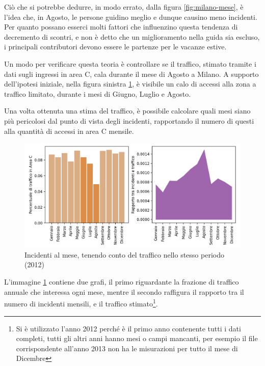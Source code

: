 \documentclass[a4paper,12pt]{report}
\begin{document}
Ciò che si potrebbe dedurre, in modo errato, dalla figura \ref{fig:milano-mese}, 
è l'idea che, in Agosto, le persone guidino meglio e dunque causino meno incidenti. 
Per quanto possano esserci molti fattori che influenzino questa tendenza di 
decremento di scontri, e non è detto che un miglioramento nella guida sia escluso, 
i principali contributori devono essere le partenze 
per le vacanze estive.

Un modo per verificare questa teoria è controllare se il traffico, 
stimato tramite i dati sugli ingressi in area C, cala durante il mese di 
Agosto a Milano. 
A supporto dell'ipotesi iniziale, nella figura sinistra \ref{fig:incidenti-traffico-mese}, 
è visibile un calo di accessi alla zona a traffico limitato, 
durante i mesi di Giugno, Luglio e Agosto.

Una volta ottenuta una stima del traffico, è possibile calcolare quali mesi 
siano più pericolosi dal punto di vista degli incidenti, 
rapportando il numero di questi alla quantità di accessi in area C mensile.

\begin{figure}
    \includegraphics[width=\linewidth]{../src/area_c/rapporto_mese.png}
    \caption{Incidenti al mese, tenendo conto del traffico nello stesso periodo (2012)}
    \label{fig:incidenti-traffico-mese}
\end{figure}

L'immagine \ref{fig:incidenti-traffico-mese} contiene due grafi, 
il primo riguardante la frazione di traffico annuale che interessa ogni mese, 
mentre il secondo raffigura il rapporto tra il numero di incidenti mensili, e il traffico 
stimato\footnote{Si è utilizzato l'anno 2012 perché è il primo anno contenente 
tutti i dati completi, tutti gli altri anni hanno mesi o campi mancanti, 
per esempio il file corrispondente all'anno 
2013 non ha le misurazioni per tutto il mese di Dicembre}.
\end{document}
